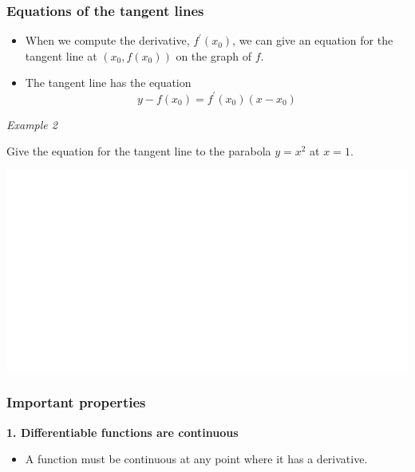 \documentclass[]{book}
\providecommand{\tightlist}{%
  \setlength{\itemsep}{0pt}\setlength{\parskip}{0pt}}
\begin{document}
\hypertarget{equations-of-the-tangent-lines}{%
\subsubsection{Equations of the tangent lines}\label{equations-of-the-tangent-lines}}

\begin{itemize}
\tightlist
\item
  When we compute the derivative, \(f^\prime(x_0)\), we can give an equation for the tangent line at \((x_0, f(x_0))\) on the graph of \(f\).
\item
  The tangent line has the equation \[y-f(x_0)= f^\prime(x_0)(x-x_0)\]
\end{itemize}

\newpage

\emph{Example 2}

Give the equation for the tangent line to the parabola \(y=x^2\) at \(x=1\).

\begin{center}\includegraphics[width=1\linewidth]{figure/Devbox2-1} \end{center}

\hypertarget{important-properties}{%
\subsubsection{Important properties}\label{important-properties}}

\textbf{1. Differentiable functions are continuous}

\begin{itemize}
\tightlist
\item
  A function must be continuous at any point where it has a derivative.
\end{itemize}

\newpage
\end{document}
